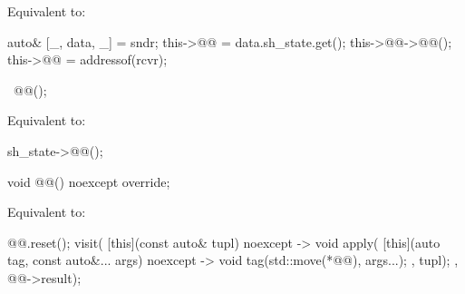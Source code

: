\begin{itemdescr}
\pnum
\effects
Equivalent to:
\begin{codeblock}
auto& [_, data, _] = sndr;
this->@@ = data.sh_state.get();
this->@@->@@();
this->@@ = addressof(rcvr);
\end{codeblock}
\end{itemdescr}

\begin{itemdecl}
~@@();
\end{itemdecl}

\begin{itemdescr}
\pnum
\effects
Equivalent to:
\begin{codeblock}
sh_state->@@();
\end{codeblock}
\end{itemdescr}

\begin{itemdecl}
void @@() noexcept override;
\end{itemdecl}

\begin{itemdescr}
\pnum
\effects
Equivalent to:
\begin{codeblock}
@@.reset();
visit(
  [this](const auto& tupl) noexcept -> void {
    apply(
      [this](auto tag, const auto&... args) noexcept -> void {
        tag(std::move(*@@), args...);
      },
      tupl);
  },
  @@->result);
\end{codeblock}
\end{itemdescr}

